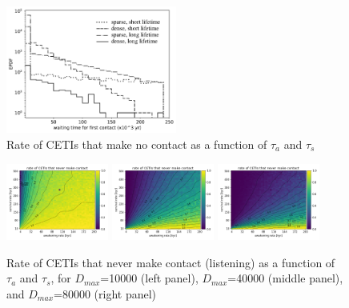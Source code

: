 \documentclass[crop]{CSLB}%
\begin{document}
\begin{figure} %
   \centering
   \includegraphics[width=0.5\textwidth]{F2.pdf}
   \caption{Rate of CETIs that make no contact as a function of
   $\tau_a$ and $\tau_s$}
   \label{F_res_2}
\end{figure}
 





 
\begin{figure} %
   \centering
   \includegraphics[width=0.3\textwidth]{m1d2.png}%
   \includegraphics[width=0.3\textwidth]{m1d3.png}%
   \includegraphics[width=0.3\textwidth]{m1d4.png}
   \caption{Rate of CETIs that never make contact (listening) as a
   function of $\tau_a$ and $\tau_s$, for 
   $D_{max}$=10000 (left panel),
   $D_{max}$=40000 (middle panel), and
   $D_{max}$=80000 (right panel)}
   \label{F_res_3}
\end{figure}
\end{document}
